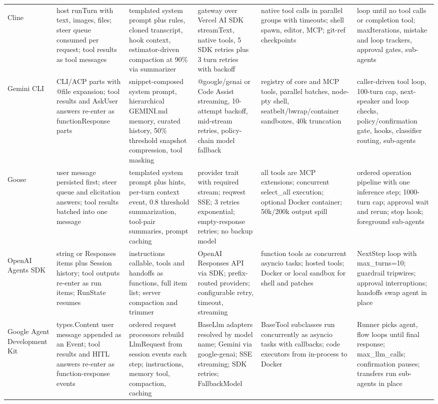 \begin{longtable}{@{}>{\bfseries\raggedright\arraybackslash}p{1.6cm}*{5}{>{\raggedright\arraybackslash}p{2.84cm}}@{}}
\addlinespace
Cline & host runTurn with text, images, files; steer queue consumed per request; tool results as tool messages & templated system prompt plus rules, cloned transcript, hook context, estimator-driven compaction at 90\% via summarizer & gateway over Vercel AI SDK streamText, native tools, 5 SDK retries plus 3 turn retries with backoff & native tool calls in parallel groups with timeouts; shell spawn, editor, MCP; git-ref checkpoints & loop until no tool calls or completion tool; maxIterations, mistake and loop trackers, approval gates, sub-agents \\
\addlinespace
Gemini CLI & CLI/ACP parts with @file expansion; tool results and AskUser answers re-enter as functionResponse parts & snippet-composed system prompt, hierarchical GEMINI.md memory, curated history, 50\% threshold snapshot compression, tool masking & @google/genai or Code Assist streaming, 10-attempt backoff, mid-stream retries, policy-chain model fallback & registry of core and MCP tools, parallel batches, node-pty shell, seatbelt/bwrap/container sandboxes, 40k truncation & caller-driven tool loop, 100-turn cap, next-speaker and loop checks, policy/confirmation gate, hooks, classifier routing, sub-agents \\
\addlinespace
Goose & user message persisted first; steer queue and elicitation answers; tool results batched into one message & templated system prompt plus hints, per-turn context event, 0.8 threshold summarization, tool-pair summaries, prompt caching & provider trait with required stream; reqwest SSE; 3 retries exponential; empty-response retries; no backup model & all tools are MCP extensions; concurrent select\_all execution; optional Docker container; 50k/200k output spill & ordered operation pipeline with one inference step; 1000-turn cap; approval wait and rerun; stop hook; foreground sub-agents \\
\addlinespace
OpenAI Agents SDK & string or Responses items plus Session history; tool outputs re-enter as run items; RunState resumes & instructions callable, tools and handoffs as functions, full item list; server compaction and trimmer & OpenAI Responses API via SDK; prefix-routed providers; configurable retry, timeout, streaming & function tools as concurrent asyncio tasks; hosted tools; Docker or local sandbox for shell and patches & NextStep loop with max\_turns=10; guardrail tripwires; approval interruptions; handoffs swap agent in place \\
\addlinespace
Google Agent Development Kit & types.Content user message appended as an Event; tool results and HITL answers re-enter as function-response events & ordered request processors rebuild LlmRequest from session events each step; instructions, memory tool, compaction, caching & BaseLlm adapters resolved by model name; Gemini via google-genai; SSE streaming; SDK retries; FallbackModel & BaseTool subclasses run concurrently as asyncio tasks with callbacks; code executors from in-process to Docker & Runner picks agent, flow loops until final response; max\_llm\_calls; confirmation pauses; transfers run sub-agents in place \\

\end{longtable}
